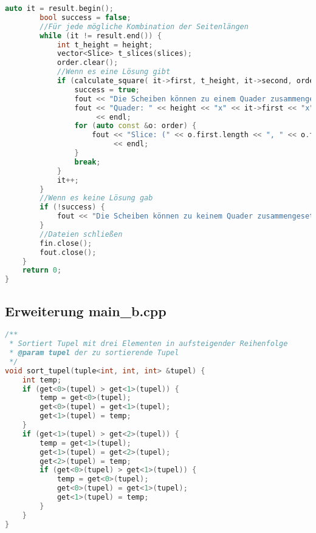 \documentclass[a4paper,10pt,ngerman]{scrartcl}
\begin{document}
\begin{lstlisting}[frame=single,language=C++,title=Methode main,breaklines=true,label={lst:code_main}]
        auto it = result.begin();
        bool success = false;
        //Für jede mögliche Kombination der Seitenlängen
        while (it != result.end()) {
            int t_height = height;
            vector<Slice> t_slices(slices);
            order.clear();
            //Wenn es eine Lösung gibt
            if (calculate_square( it->first, t_height, it->second, order, t_slices)) {
                success = true;
                fout << "Die Scheiben können zu einem Quader zusammengesetzt werden." << endl;
                fout << "Quader: " << height << "x" << it->first << "x" << it->second << " V(" << volume << ")" << endl
                     << endl;
                for (auto const &o: order) {
                    fout << "Slice: (" << o.first.length << ", " << o.first.height << ") Dimension: " << to_string(o.second)
                         << endl;
                }
                break;
            }
            it++;
        }
        //Wenn es keine Lösung gab
        if (!success) {
            fout << "Die Scheiben können zu keinem Quader zusammengesetzt werden." << endl;
        }
        //Dateien schließen
        fin.close();
        fout.close();
    }
    return 0;
}
    \end{lstlisting}

    \subsection{Erweiterung main\_b.cpp}\label{subsec:erweiterung}

    \begin{lstlisting}[frame=single,language=C++,title=Methode sort\_tupel,breaklines=true,label={lst:code_sortTupel}]
/**
 * Sortiert Tupel mit drei Elementen in aufsteigender Reihenfolge
 * @param tupel der zu sortierende Tupel
 */
void sort_tupel(tuple<int, int, int> &tupel) {
    int temp;
    if (get<0>(tupel) > get<1>(tupel)) {
        temp = get<0>(tupel);
        get<0>(tupel) = get<1>(tupel);
        get<1>(tupel) = temp;
    }
    if (get<1>(tupel) > get<2>(tupel)) {
        temp = get<1>(tupel);
        get<1>(tupel) = get<2>(tupel);
        get<2>(tupel) = temp;
        if (get<0>(tupel) > get<1>(tupel)) {
            temp = get<0>(tupel);
            get<0>(tupel) = get<1>(tupel);
            get<1>(tupel) = temp;
        }
    }
}
    \end{lstlisting}

    \newpage
\end{document}
